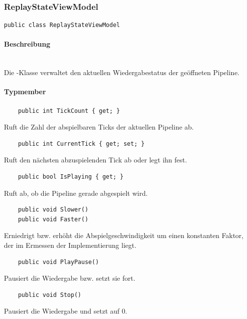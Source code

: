 \subsubsection{ReplayStateViewModel}

\begin{verbatim}
public class ReplayStateViewModel
\end{verbatim}

\paragraph{Beschreibung}~\\
Die -Klasse verwaltet den aktuellen Wiedergabestatus der geöffneten Pipeline.

\paragraph{Typmember}
\begin{itemize}

	\begin{verbatim}
	public int TickCount { get; }
	\end{verbatim}
	Ruft die Zahl der abspielbaren Ticks der aktuellen Pipeline ab.

	\begin{verbatim}
	public int CurrentTick { get; set; }
	\end{verbatim}
	Ruft den nächsten abzuspielenden Tick ab oder legt ihn fest.

	\begin{verbatim}
	public bool IsPlaying { get; }
	\end{verbatim}
	Ruft ab, ob die Pipeline gerade abgespielt wird.

	\begin{verbatim}
	public void Slower()
	public void Faster()
	\end{verbatim}
	Erniedrigt bzw. erhöht die Abspielgeschwindigkeit um einen konstanten Faktor, der im Ermessen der Implementierung liegt.

	\begin{verbatim}
	public void PlayPause()
	\end{verbatim}
	Pausiert die Wiedergabe bzw. setzt sie fort.

	\begin{verbatim}
	public void Stop()
	\end{verbatim}
	Pausiert die Wiedergabe und setzt  auf 0.

\end{itemize}